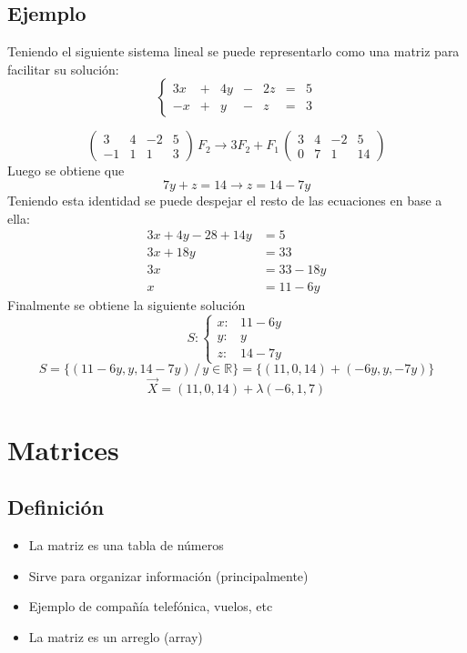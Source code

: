 \documentclass{article}
\begin{document}
\subsection{Ejemplo}
Teniendo el siguiente sistema lineal se puede representarlo como una matriz para facilitar su solución:
\[\left\{
\begin{array}{ccccccc}
    3x & + & 4y & - & 2z & = & 5 \\
    -x & + & y & - & z & = & 3
\end{array}
\right.
\]

\[
\left(
\begin{array}{ccc|c}
     3 & 4 & -2 & 5 \\
     -1 & 1 & 1 & 3
\end{array}
\right) 
\, F_2 \rightarrow 3F_2 + F_1 \,
\left(
\begin{array}{ccc|c}
     3 & 4 & -2 & 5 \\
     0 & 7 & 1 & 14
\end{array}
\right) 
\]
Luego se obtiene que $$7y+z=14 \rightarrow z=14-7y$$ Teniendo esta identidad se puede despejar el resto de las ecuaciones en base a ella: 
\begin{align*}
    3x+4y-28+14y & = 5\\
    3x+18y &=33 \\
    3x &=33-18y\\
    x &= 11-6y
\end{align*}
Finalmente se obtiene la siguiente solución
\[S:
\left\{
\begin{array}{cc}
     x: & 11-6y \\
     y: & y \\
     z: & 14-7y
\end{array}
\right.
\]
$$S=\{(11-6y, y, 14-7y) \, /  \,y \in \mathbb{R}\} = \{(11, 0, 14) + (-6y, y, -7y)\}$$
$$\Vec{X} = (11, 0, 14) + \lambda(-6, 1, 7)$$

\vspace{1cm}
\section{Matrices}
\subsection{Definición}
\begin{itemize}
    \item La matriz es una tabla de números
    \item Sirve para organizar información (principalmente)
    \item Ejemplo de compañía telefónica, vuelos, etc
    \item La matriz es un arreglo (array)
\end{itemize}
\end{document}
